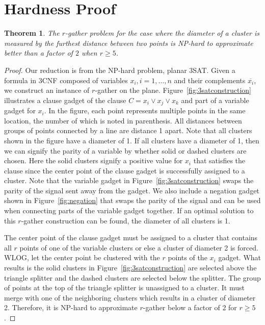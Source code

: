 \documentclass{acm_proc_article-sp}
\newtheorem{theorem}{Theorem}
\begin{document}
\section{Hardness Proof}

\begin{theorem}\label{thm:hardness1}
The $r$-gather problem for the case where the diameter of a cluster is measured by the furthest distance between two points is NP-hard to approximate better than a factor of $2$ when $r\geq5$.
\end{theorem}
\begin{proof}
Our reduction is from the NP-hard problem, planar 3SAT.  Given a formula in 3CNF composed of variables $x_i, i = 1,\dots,n$ and their complements $\overline{x_i}$, we construct an instance of $r$-gather on the plane.  Figure~\ref{fig:3satconstruction} illustrates a clause gadget of the clause $C = x_i \vee x_j \vee x_k$ and part of a variable gadget for $x_i$.  In the figure, each point represents multiple points in the same location, the number of which is noted in parenthesis.  All distances between groups of points connected by a line are distance 1 apart.  Note that all clusters shown in the figure have a diameter of 1.  If all clusters have a diameter of 1, then we can signify the parity of a variable by whether solid or dashed clusters are chosen.  Here the solid clusters signify a positive value for $x_i$ that satisfies the clause since the center point of the clause gadget is successfully assigned to a cluster.  Note that the variable gadget in Figure~\ref{fig:3satconstruction} swaps the parity of the signal sent away from the gadget.  We also include a negation gadget shown in Figure~\ref{fig:negation} that swaps the parity of the signal and can be used when connecting parts of the variable gadget together.  If an optimal solution to this $r$-gather construction can be found, the diameter of all clusters is 1.


The center point of the clause gadget must be assigned to a cluster that contains all $r$ points of one of the variable clusters or else a cluster of diameter 2 is forced.  WLOG, let the center point be clustered with the $r$ points of the $x_i$ gadget.  What results is the solid clusters in Figure~\ref{fig:3satconstruction} are selected above the triangle splitter and the dashed clusters are selected below the splitter.  The group of points at the top of the triangle splitter is unassigned to a cluster.  It must merge with one of the neighboring clusters which results in a cluster of diameter 2.  Therefore, it is NP-hard to approximate $r$-gather below a factor of 2 for $r\geq5$.
\end{proof}
\end{document}
